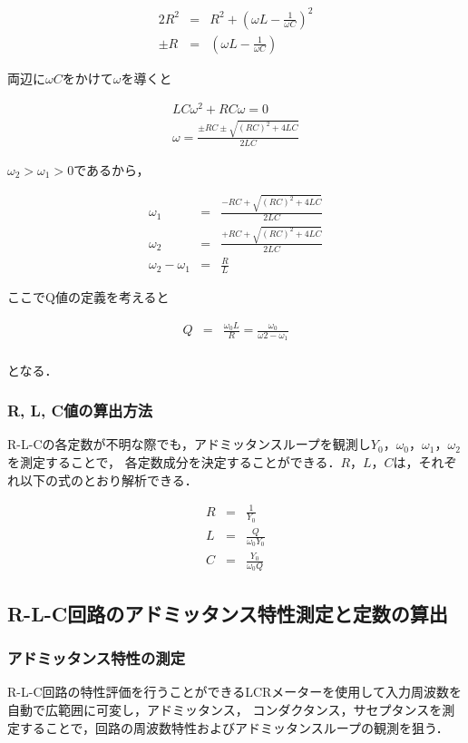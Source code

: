 \documentclass[dvipdfmx,titlepage,a4j]{jsarticle}  %
\numberwithin{equation}{section}
\begin{document}
\begin{eqnarray}
  2R^2 &=& R^2 + (\omega L - \frac{1}{\omega C})^2 \\
  \pm R &=& (\omega L - \frac{1}{\omega C})
\end{eqnarray}

両辺に$\omega C$をかけて$\omega$を導くと

\begin{eqnarray}
  LC \omega^2 + RC\omega = 0\\
  \omega = \frac{\pm RC \pm \sqrt{(RC)^2 + 4LC}}{2LC}
\end{eqnarray}

$\omega_2 > \omega_1 > 0$であるから，

\begin{eqnarray}
  \omega_1 &=& \frac{-RC + \sqrt{(RC)^2 + 4LC}}{2LC} \\
  \omega_2 &=& \frac{+RC + \sqrt{(RC)^2 + 4LC}}{2LC} \\
  \omega_2 - \omega_1 &=& \frac{R}{L}
\end{eqnarray}

ここでQ値の定義を考えると

\begin{eqnarray}
  Q &=& \frac{\omega_0 L}{R} = \frac{\omega_0}{\omega2 - \omega_1}\\
\end{eqnarray}

となる．

\subsubsection{R, L, C値の算出方法}
R-L-Cの各定数が不明な際でも，アドミッタンスループを観測し$Y_0$，$\omega_0$，$\omega_1$，$\omega_2$を測定することで，
各定数成分を決定することができる．$R$，$L$，$C$は，それぞれ以下の式のとおり解析できる．

\begin{eqnarray}
  R &=& \frac{1}{Y_0} \\
  L &=& \frac{Q}{\omega_0 Y_0} \\
  C &=& \frac{Y_0}{\omega_0 Q}
\end{eqnarray}

\subsection{R-L-C回路のアドミッタンス特性測定と定数の算出}

\subsubsection{アドミッタンス特性の測定}
R-L-C回路の特性評価を行うことができるLCRメーターを使用して入力周波数を自動で広範囲に可変し，アドミッタンス，
コンダクタンス，サセプタンスを測定することで，回路の周波数特性およびアドミッタンスループの観測を狙う．
\end{document}
